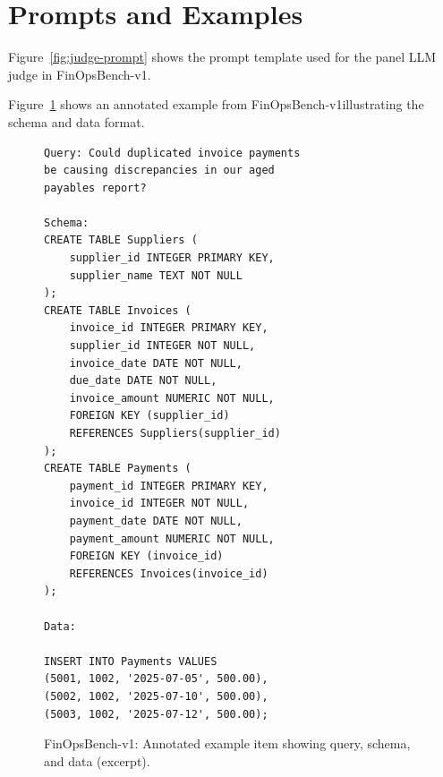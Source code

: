 \documentclass[11pt]{article}
\newcommand{\editN}[1]{\textcolor{editgreen}{#1}}
\newcommand{\synthsubset}{FinOpsBench-v1}\xspace
\begin{document}
\section{Prompts and Examples}
\label{app:prompts}

Figure~\ref{fig:judge-prompt} shows the prompt template used for the 
\editN{panel}
LLM judge in \synthsubset.

Figure~\ref{fig:example-item} shows an annotated example from \synthsubset illustrating the schema and data format.

\begin{figure}[h]
\small\centering
\begin{verbatim}
Query: Could duplicated invoice payments 
be causing discrepancies in our aged 
payables report?

Schema:
CREATE TABLE Suppliers (
    supplier_id INTEGER PRIMARY KEY,
    supplier_name TEXT NOT NULL
);
CREATE TABLE Invoices (
    invoice_id INTEGER PRIMARY KEY,
    supplier_id INTEGER NOT NULL,
    invoice_date DATE NOT NULL,
    due_date DATE NOT NULL,
    invoice_amount NUMERIC NOT NULL,
    FOREIGN KEY (supplier_id) 
    REFERENCES Suppliers(supplier_id)
);
CREATE TABLE Payments (
    payment_id INTEGER PRIMARY KEY,
    invoice_id INTEGER NOT NULL,
    payment_date DATE NOT NULL,
    payment_amount NUMERIC NOT NULL,
    FOREIGN KEY (invoice_id) 
    REFERENCES Invoices(invoice_id)
);

Data:

INSERT INTO Payments VALUES
(5001, 1002, '2025-07-05', 500.00),
(5002, 1002, '2025-07-10', 500.00),
(5003, 1002, '2025-07-12', 500.00);
\end{verbatim}
\caption{\synthsubset: Annotated example item showing query, schema, and data (excerpt).}
\label{fig:example-item}
\end{figure}
\end{document}
